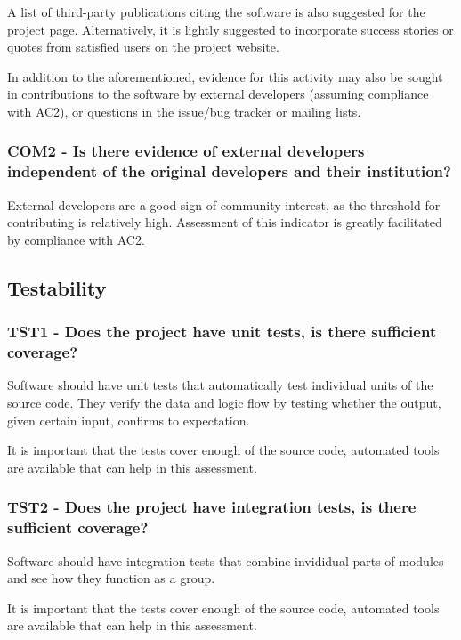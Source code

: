 \documentclass[a4paper,11pt]{article}
\begin{document}
A list of third-party publications citing the software is also suggested for
the project page. Alternatively, it is lightly suggested to
incorporate success stories or quotes from satisfied users on the project
website.

In addition to the aforementioned, evidence for this activity may also be sought
in contributions to the software by external developers (assuming
compliance with AC2), or questions in the issue/bug tracker or mailing lists.

\subsubsection{COM2 - Is there evidence of external developers independent of
the original developers and their institution?}

External developers are a good sign of community interest, as the threshold for
contributing is relatively high. Assessment of this indicator is greatly facilitated by
compliance with AC2.


\subsection{Testability}

\subsubsection{TST1 - Does the project have unit tests, is there sufficient coverage?}

Software should have unit tests that automatically test individual units of the
source code. They verify the data and logic flow by testing whether the output,
given certain input, confirms to expectation.

It is important that the tests cover enough of the source code, automated tools
are available that can help in this assessment.

\subsubsection{TST2 - Does the project have integration tests, is there sufficient coverage?}

Software should have integration tests that combine invididual parts of modules and see how they function
as a group.

It is important that the tests cover enough of the source code, automated tools
are available that can help in this assessment.
\end{document}
